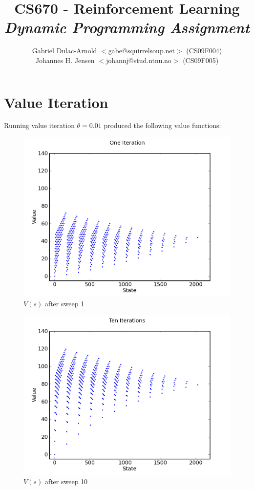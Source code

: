 \documentclass[a4paper]{article}
\author{Gabriel Dulac-Arnold $<$gabe@squirrelsoup.net$>$ (CS09F004) \\
Johannes H. Jensen $<$johannj@stud.ntnu.no$>$ (CS09F005)}
\title{CS670 - Reinforcement Learning \\
\emph{Dynamic Programming Assignment}}
\begin{document}
\setlength{\parskip}{2ex}
\maketitle

\section{Value Iteration}

Running value iteration $\theta=0.01$ produced the following value functions:

\begin{figure}[h]
\center
\includegraphics[scale=0.75]{../graphs/value_iteration/one_iteration.png}
\caption{$V(s)$ after sweep 1}
\end{figure}

\begin{figure}[h]
\center
\includegraphics[scale=0.75]{../graphs/value_iteration/ten_iterations.png}
\caption{$V(s)$ after sweep 10}
\end{figure}
\end{document}
